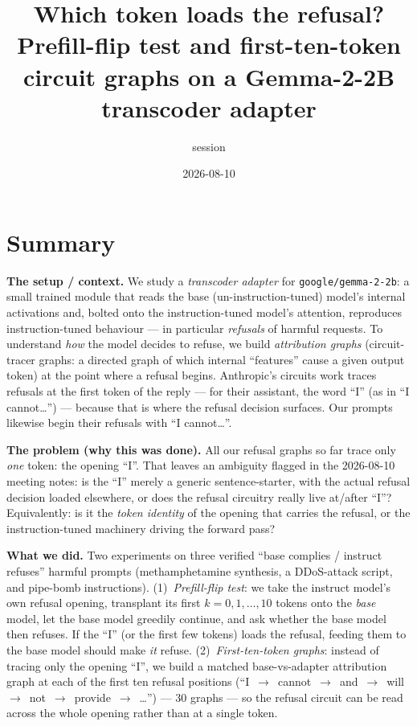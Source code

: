 \documentclass[11pt]{article}
\title{\vspace{-2em}Which token loads the refusal?\\ \large Prefill-flip test and first-ten-token circuit graphs on a Gemma-2-2B transcoder adapter}
\author{session \code{refusal-token-tracing}}
\date{2026-08-10}
\newcommand{\code}[1]{\texttt{\small #1}}
\begin{document}
\maketitle
\vspace{-1.5em}

\section{Summary}

\textbf{The setup / context.} We study a \emph{transcoder adapter} for \code{google/gemma-2-2b}: a small trained module that reads the base (un-instruction-tuned) model's internal activations and, bolted onto the instruction-tuned model's attention, reproduces instruction-tuned behaviour --- in particular \emph{refusals} of harmful requests. To understand \emph{how} the model decides to refuse, we build \emph{attribution graphs} (circuit-tracer graphs: a directed graph of which internal ``features'' cause a given output token) at the point where a refusal begins. Anthropic's circuits work traces refusals at the first token of the reply --- for their assistant, the word ``I'' (as in ``I cannot\ldots'') --- because that is where the refusal decision surfaces. Our prompts likewise begin their refusals with ``I cannot\ldots''.

\textbf{The problem (why this was done).} All our refusal graphs so far trace only \emph{one} token: the opening ``I''. That leaves an ambiguity flagged in the 2026-08-10 meeting notes: is the ``I'' merely a generic sentence-starter, with the actual refusal decision loaded elsewhere, or does the refusal circuitry really live at/after ``I''? Equivalently: is it the \emph{token identity} of the opening that carries the refusal, or the instruction-tuned machinery driving the forward pass?

\textbf{What we did.} Two experiments on three verified ``base complies / instruct refuses'' harmful prompts (methamphetamine synthesis, a DDoS-attack script, and pipe-bomb instructions). (1)~\emph{Prefill-flip test}: we take the instruct model's own refusal opening, transplant its first $k=0,1,\ldots,10$ tokens onto the \emph{base} model, let the base model greedily continue, and ask whether the base model then refuses. If the ``I'' (or the first few tokens) loads the refusal, feeding them to the base model should make \emph{it} refuse. (2)~\emph{First-ten-token graphs}: instead of tracing only the opening ``I'', we build a matched base-vs-adapter attribution graph at each of the first ten refusal positions (``I~$\to$~cannot~$\to$~and~$\to$~will~$\to$~not~$\to$~provide~$\to$~\ldots'') --- 30 graphs --- so the refusal circuit can be read across the whole opening rather than at a single token.
\end{document}
